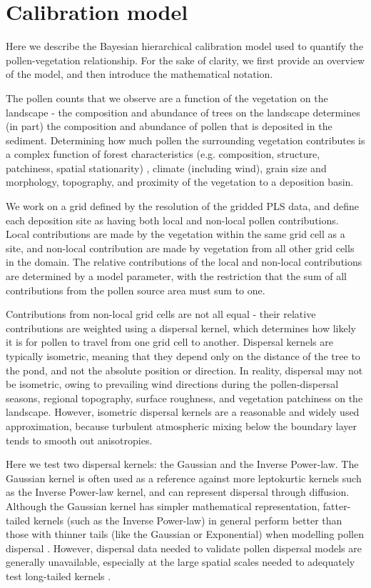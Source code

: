 \documentclass[12pt]{article}
\begin{document}
\section{Calibration model}

Here we describe the Bayesian hierarchical calibration model used to
quantify the pollen-vegetation relationship. For the sake of clarity,
we first provide an overview of the model, and then introduce the
mathematical notation.

The pollen counts that we observe are a function of the vegetation on
the landscape - the composition and abundance of trees on the
landscape determines (in part) the composition and abundance of pollen
that is deposited in the sediment. Determining how much pollen the
surrounding vegetation contributes is a complex function of forest
characteristics (e.g. composition, structure, patchiness, spatial
stationarity) , climate (including wind), grain size and morphology,
topography, and proximity of the vegetation to a deposition basin.

We work on a grid defined by the resolution of the gridded PLS data,
and define each deposition site as having both local and non-local
pollen contributions. Local contributions are made by the vegetation
within the same grid cell as a site, and non-local contribution are
made by vegetation from all other grid cells in the domain. The
relative contributions of the local and non-local contributions are
determined by a model parameter, with the restriction that the sum of
all contributions from the pollen source area must sum to one.

Contributions from non-local grid cells are not all equal - their
relative contributions are weighted using a dispersal kernel, which
determines how likely it is for pollen to travel from one grid cell to
another. Dispersal kernels are typically isometric, meaning that they
depend only on the distance of the tree to the pond, and not the
absolute position or direction. In reality, dispersal may not be
isometric, owing to prevailing wind directions during the
pollen-dispersal seasons, regional topography, surface roughness, and
vegetation patchiness on the landscape. However, isometric dispersal
kernels are a reasonable and widely used approximation, because
turbulent atmospheric mixing below the boundary layer tends to smooth
out anisotropies.

Here we test two dispersal kernels: the Gaussian and the Inverse
Power-law. The Gaussian kernel is often used as a reference against
more leptokurtic kernels such as the Inverse Power-law kernel, and can
represent dispersal through diffusion. Although the Gaussian kernel
has simpler mathematical representation, fatter-tailed kernels (such
as the Inverse Power-law) in general perform better than those with
thinner tails (like the Gaussian or Exponential) when modelling pollen
dispersal \citep{devaux2007modelling, austerlitz2004using}. However,
dispersal data needed to validate pollen dispersal models are
generally unavailable, especially at the large spatial scales needed
to adequately test long-tailed kernels \citep{clobert2012dispersal}.
\end{document}
